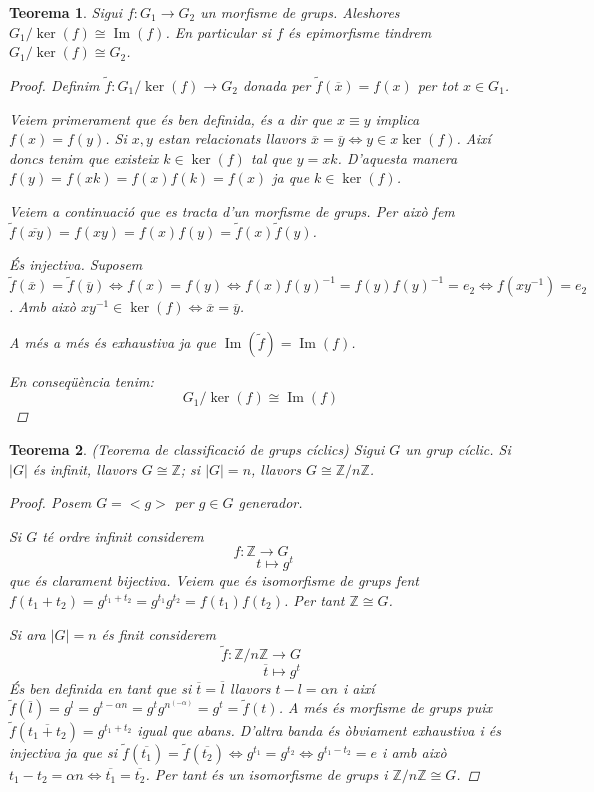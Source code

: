 \documentclass[a4paper,11pt]{report}
\newcommand{\inv}[1]{#1^{-1}}
\renewcommand{\bar}{\overline}
\theoremstyle{theorem}
\newtheorem{teorema}{\normalfont \sffamily\bfseries Teorema}[section]
\theoremstyle{definition}
\DeclareMathOperator{\ima}{Im}
\begin{document}
\begin{teorema}
		Sigui $f:G_1\longrightarrow G_2$ un morfisme de grups. Aleshores $G_1/\ker(f)\cong\ima(f)$. En particular si $f$ és epimorfisme tindrem $G_1/\ker(f)\cong G_2$.
		\begin{proof}
			Definim $\tilde{f}:G_1/\ker(f)\longrightarrow G_2$ donada per $\tilde{f}(\bar{x})=f(x)$ per tot $x\in G_1$.
			
			Veiem primerament que és ben definida, és a dir que $x\equiv y $ implica $f(x)=f(y)$. Si $x,y$ estan relacionats llavors $\bar{x}=\bar{y}\Leftrightarrow y\in x\ker(f)$. Així doncs tenim que existeix $k\in\ker(f)$ tal que $y=xk$. D'aquesta manera $f(y)=f(xk)=f(x)f(k)=f(x)$ ja que $k\in\ker(f)$.
			
			Veiem a continuació que es tracta d'un morfisme de grups. Per això fem $\tilde{f}(\bar{xy})=f(xy)=f(x)f(y)=\tilde{f}(x)\tilde{f}(y)$.
			
			És injectiva. Suposem $\tilde{f}(\bar{x})=\tilde{f}(\bar{y})\Leftrightarrow f(x)=f(y)\Leftrightarrow f(x)\inv{f(y)}=f(y)\inv{f(y)}=e_2\Leftrightarrow f(x\inv{y})=e_2$. Amb això $x\inv{y}\in\ker(f)\Leftrightarrow \bar{x}=\bar{y}$.
			
			A més a més és exhaustiva ja que $\ima(\tilde{f})=\ima(f)$.
			
			En conseqüència tenim:
			$$G_1/\ker(f)\cong\ima(f)$$
		\end{proof}
\end{teorema}

\begin{teorema}(Teorema de classificació de grups cíclics)
	Sigui $G$ un grup cíclic. Si $|G|$ és infinit, llavors $G\cong\mathbb{Z}$; si $|G|=n$, llavors $G\cong\mathbb{Z}/n\mathbb{Z}$.
	\begin{proof}
		Posem $G=<g>$ per $g\in G$ generador. 
		
		Si $G$ té ordre infinit considerem $$f:\mathbb{Z}\longrightarrow G$$ $$\quad\quad t\longmapsto g^t$$ que és clarament bijectiva. Veiem que és isomorfisme de grups fent $f(t_1+t_2)=g^{t_1+t_2}=g^{t_1}g^{t_2}=f(t_1)f(t_2)$. Per tant $\mathbb{Z}\cong G$.
		
	Si ara $|G|=n$ és finit considerem $$\tilde{f}:\mathbb{Z}/n\mathbb{Z}\longrightarrow G$$ $$\quad\quad\quad \bar{t}\longmapsto g^t$$
	És ben definida en tant que si $\bar{t}=\bar{l}$ llavors $t-l=\alpha n$ i així $\tilde{f}(\bar{l})=g^l=g^{t-\alpha n}=g^tg^{n^{(-\alpha)}}=g^t=\tilde{f}(t)$. A més és morfisme de grups puix $\tilde{f}(\overline{t_1 +t_2})=g^{t_1+t_2}$ igual que abans. D'altra banda és òbviament exhaustiva i és injectiva ja que si $\tilde{f}(\overline{t_1})=\tilde{f}(\overline{t_2})\Leftrightarrow g^{t_1}=g^{t_2}\Leftrightarrow g^{t_1-t_2}=e$ i amb això $t_1-t_2=\alpha n\Leftrightarrow \overline{t_1}=\overline{t_2}$. Per tant és un isomorfisme de grups i $\mathbb{Z}/n\mathbb{Z}\cong G$.
	\end{proof} 
\end{teorema}
\end{document}
